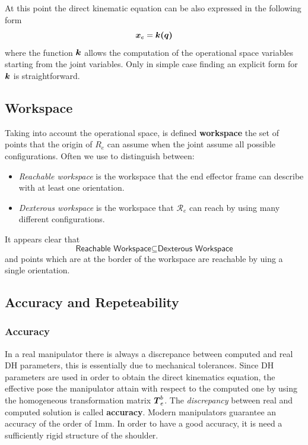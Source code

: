 At this point the direct kinematic equation can be also expressed in the following form
\begin{equation}
    \boldsymbol{x}_e=\boldsymbol{k(q)}
\end{equation}
where the function $\boldsymbol{k}$ allows the computation of the operational space variables starting from the joint variables. Only in simple case finding an explicit form for $\boldsymbol{k}$ is straightforward.

\subsection{Workspace}
Taking into account the operational space, is defined \textbf{workspace} the set of points that the origin of $R_e$ can assume when the joint assume all possible configurations. Often we use to distinguish between:
\begin{itemize}
    \itemsep-0.3em
    \item \textit{Reachable workspace} is the workspace that the end effector frame can describe with at least one orientation.
    \item \textit{Dexterous workspace} is the workspace that $\mathcal{R}_e$ can reach by using many different configurations.
\end{itemize}
It appears clear that
\begin{equation*}
    \textsf{Reachable Workspace} \subseteq \textsf{Dexterous Workspace}
\end{equation*}
and points which are at the border of the workspace are reachable by uing a single orientation.

\subsection{Accuracy and Repeteability}
\subsubsection{Accuracy}
In a real manipulator there is always a discrepance between computed and real DH parameters, this is essentially due to mechanical tolerances. Since DH parameters are used in order to obtain the direct kinematics equation, the effective pose the manipulator attain with respect to the computed one by using the homogeneous transformation matrix $\boldsymbol{T}_e^b$. The \textit{discrepancy} between real and computed solution is called \textbf{accuracy}. Modern manipulators guarantee an accuracy of the order of 1mm. In order to have a good accuracy, it is need a sufficiently rigid structure of the shoulder.


